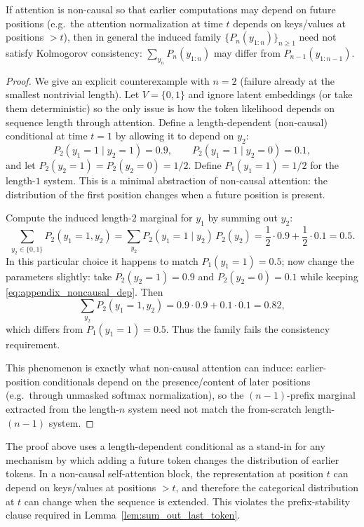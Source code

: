 \documentclass[11pt]{article}
\begin{document}
\begin{proposition}
If attention is non-causal so that earlier computations may depend on future positions (e.g.\ the attention
normalization at time $t$ depends on keys/values at positions $>t$), then in general the induced family
$\{P_n(y_{1:n})\}_{n\ge 1}$ need not satisfy Kolmogorov consistency:
$\sum_{y_n} P_n(y_{1:n})$ may differ from $P_{n-1}(y_{1:n-1})$.
\end{proposition}

\begin{proof}
We give an explicit counterexample with $n=2$ (failure already at the smallest nontrivial length).
Let $V=\{0,1\}$ and ignore latent embeddings (or take them deterministic) so the only issue is how the
token likelihood depends on sequence length through attention. Define a length-dependent (non-causal)
conditional at time $t=1$ by allowing it to depend on $y_2$:
\begin{equation}
P_2(y_1=1 \mid y_2=1)=0.9,\qquad P_2(y_1=1 \mid y_2=0)=0.1,
\label{eq:appendix_noncausal_dep}
\end{equation}
and let $P_2(y_2=1)=P_2(y_2=0)=1/2$. Define $P_1(y_1=1)=1/2$ for the length-$1$ system.
This is a minimal abstraction of non-causal attention: the distribution of the first position changes when
a future position is present.

Compute the induced length-$2$ marginal for $y_1$ by summing out $y_2$:
\[
\sum_{y_2\in\{0,1\}} P_2(y_1=1,y_2)
=
\sum_{y_2} P_2(y_1=1\mid y_2)\,P_2(y_2)
=
\frac{1}{2}\cdot 0.9 + \frac{1}{2}\cdot 0.1
=
0.5.
\]
In this particular choice it happens to match $P_1(y_1=1)=0.5$; now change the parameters slightly:
take $P_2(y_2=1)=0.9$ and $P_2(y_2=0)=0.1$ while keeping \eqref{eq:appendix_noncausal_dep}.
Then
\[
\sum_{y_2} P_2(y_1=1,y_2)
=
0.9\cdot 0.9 + 0.1\cdot 0.1
=
0.82,
\]
which differs from $P_1(y_1=1)=0.5$.
Thus the family fails the consistency requirement.

This phenomenon is exactly what non-causal attention can induce: earlier-position conditionals depend on
the presence/content of later positions (e.g.\ through unmasked softmax normalization), so the $(n-1)$-prefix
marginal extracted from the length-$n$ system need not match the from-scratch length-$(n-1)$ system.
\end{proof}

\begin{remark}
The proof above uses a length-dependent conditional as a stand-in for any mechanism by which adding a future token
changes the distribution of earlier tokens. In a non-causal self-attention block, the representation at position $t$
can depend on keys/values at positions $>t$, and therefore the categorical distribution at $t$ can change when the
sequence is extended. This violates the prefix-stability clause required in Lemma~\ref{lem:sum_out_last_token}.
\end{remark}
\end{document}
